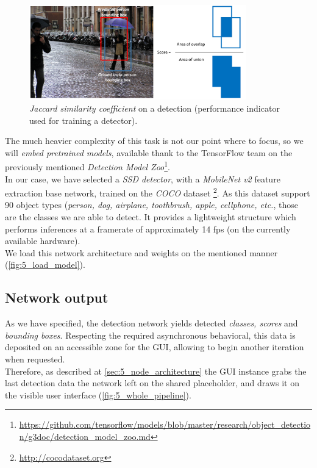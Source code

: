 		\begin{figure}[h!]
			\centering
			\includegraphics[width=3.7in]{images/detection_iou}
			\caption{\emph{Jaccard similarity coefficient} on a detection (performance indicator used for training a detector).}
			\label{fig:5_iou}
		\end{figure}
	
		The much heavier complexity of this task is not our point where to focus, so we will \emph{embed pretrained models}, available thank to the TensorFlow team on the previously mentioned \emph{Detection Model Zoo}\footnote{\url{https://github.com/tensorflow/models/blob/master/research/object_detection/g3doc/detection_model_zoo.md}}.\\
		
		In our case, we have selected a \emph{SSD detector}, with a \emph{MobileNet v2} feature extraction base network, trained on the \emph{COCO} dataset \footnote{\url{http://cocodataset.org}}. As this dataset support 90 object types (\emph{person, dog, airplane, toothbrush, apple, cellphone, etc.}, those are the classes we are able to detect. It provides a lightweight structure which performs inferences at a framerate of approximately 14 fps (on the currently available hardware).\\
		
		We load this network architecture and weights on the mentioned manner (\autoref{fig:5_load_model}). 
	
	
	\subsection{Network output}
		As we have specified, the detection network yields detected \emph{classes, scores} and \emph{bounding boxes}. Respecting the required asynchronous behavioral, this data is deposited on an accessible zone for the GUI, allowing to begin another iteration when requested.\\
		
		Therefore, as described at \autoref{sec:5_node_architecture} the GUI instance grabs the last detection data the network left on the shared placeholder, and draws it on the visible user interface (\autoref{fig:5_whole_pipeline}).
		
